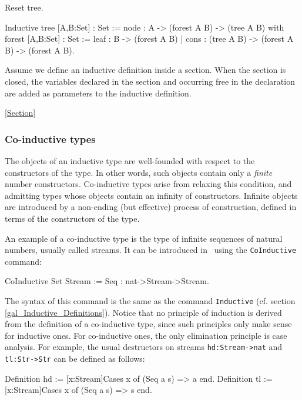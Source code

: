 \begin{coq_eval}
Reset tree.
\end{coq_eval}
\begin{coq_example*}
Inductive
     tree   [A,B:Set] : Set := node : A -> (forest A B) -> (tree A B)
with forest [A,B:Set] : Set := leaf : B -> (forest A B)
                   | cons : (tree A B) -> (forest A B) -> (forest A B).
\end{coq_example*}

Assume we define an inductive definition inside a section.  When the
section is closed, the variables declared in the section and occurring
free in the declaration are added as parameters to the inductive
definition. 

\SeeAlso \ref{Section}

\subsubsection{Co-inductive types}

The objects of an inductive type are well-founded with respect to the
constructors of the type. In other words, such objects contain only a
{\it finite} number constructors. Co-inductive types arise from
relaxing this condition, and admitting types whose objects contain an
infinity of constructors. Infinite objects are introduced by a
non-ending (but effective) process of construction, defined in terms
of the constructors of the type.

An example of a co-inductive type is the type of infinite sequences of
natural numbers, usually called streams. It can be introduced in \Coq\
using the \texttt{CoInductive} command:
\begin{coq_example}
CoInductive Set Stream  := Seq : nat->Stream->Stream.
\end{coq_example}

The syntax of this command is the same as the command \texttt{Inductive}
(cf. section \ref{gal_Inductive_Definitions}). Notice that no
principle of induction is derived from the definition of a
co-inductive type, since such principles only make sense for inductive
ones. For co-inductive ones, the only elimination principle is case
analysis. For example, the usual destructors on streams
\texttt{hd:Stream->nat} and \texttt{tl:Str->Str} can be defined as
follows:
\begin{coq_example}
Definition hd  := [x:Stream]Cases x of (Seq a s) => a  end.
Definition tl  := [x:Stream]Cases x of (Seq a s) => s  end.
\end{coq_example}

